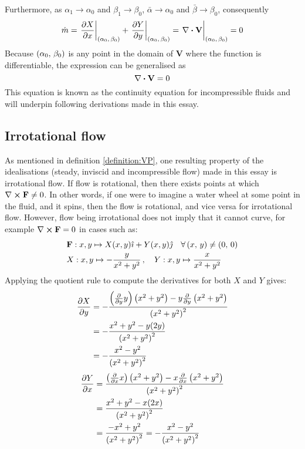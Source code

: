 Furthermore, as $\alpha_1\rightarrow\alpha_0$ and $\beta_1\rightarrow\beta_0$, $\bar{\alpha}\rightarrow\alpha_0$ and $\bar{\beta}\rightarrow\beta_0$, consequently
$$
    \dot{m}=\eval{\pdv{X}{x}}_{\point{\alpha_0}{\beta_0}}+\eval{\pdv{Y}{y}}_{\point{\alpha_0}{\beta_0}}=\eval{\divergence{\mathbf{V}}}_{\point{\alpha_0}{\beta_0}}=0
$$
Because $\left(\alpha_0,\,\beta_0\right)$ is any point in the domain of $\mathbf{V}$ where the function is differentiable, the expression can be generalised as
$$
    \divergence{\mathbf{V}}=0
$$
This equation is known as the continuity equation for incompressible fluids \cite{PHAM2014405} and will underpin following derivations made in this essay.

\subsection{Irrotational flow}\label{section:IRROTATIONAL}
As mentioned in definition \ref{definition:VP}, one resulting property of the idealisations (steady, inviscid and incompressible flow)
made in this essay is irrotational flow. If flow is rotational, then there exists points at which $\curl{\fatf}\neq0$. In other words, if one were to
imagine a water wheel at some point in the fluid, and it spins, then the flow is rotational, and vice versa for irrotational flow.
However, flow being irrotational does not imply that it cannot curve, for example $\curl{\fatf}=0$ in cases such as:
\begin{align*}
    &\mathbf{F}:x,y\mapsto X(x,y)\hat{\imath}+Y(x,y)\hat{\jmath}\quad\forall\left(x,\,y\right)\neq\left(0,\,0\right)\\
    &X:x,y\mapsto-\frac{y}{x^2+y^2}\,,\quad Y:x,y\mapsto\frac{x}{x^2+y^2}
\end{align*}
Applying the quotient rule to compute the derivatives for both $X$ and $Y$ gives:
\begin{align*}
    \pdv{X}{y}&=-\frac{\left(\pdv{y}y\right)\left(x^2+y^2\right)-y\pdv{y}\left(x^2+y^2\right)}{\left(x^2+y^2\right)^2}\\
    &=-\frac{x^2+y^2-y(2y)}{\left(x^2+y^2\right)^2}\\
    &=-\frac{x^2-y^2}{\left(x^2+y^2\right)^2}
\end{align*}
\begin{align*}
    \pdv{Y}{x}&=\frac{\left(\pdv{x}x\right)\left(x^2+y^2\right)-x\pdv{x}\left(x^2+y^2\right)}{\left(x^2+y^2\right)^2}\\
    &=\frac{x^2+y^2-x(2x)}{\left(x^2+y^2\right)^2}\\
    &=\frac{-x^2+y^2}{\left(x^2+y^2\right)^2}=-\frac{x^2-y^2}{\left(x^2+y^2\right)^2}
\end{align*}
